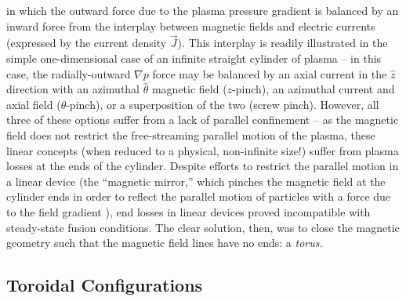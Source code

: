 \noindent in which the outward force due to the plasma pressure gradient is balanced by an inward force from the interplay between magnetic fields and electric currents (expressed by the current density $\vec{J}$).  This interplay is readily illustrated in the simple one-dimensional case of an infinite straight cylinder of plasma -- in this case, the radially-outward $\nabla p$ force may be balanced by an axial current in the $\hat{z}$ direction with an azimuthal $\hat{\theta}$ magnetic field ($z$-pinch), an azimuthal current and axial field ($\theta$-pinch), or a superposition of the two (screw pinch).  However, all three of these options suffer from a lack of parallel confinement -- as the magnetic field does not restrict the free-streaming parallel motion of the plasma, these linear concepts (when reduced to a physical, non-infinite size!) suffer from plasma losses at the ends of the cylinder.  Despite efforts to restrict the parallel motion in a linear device (\eg the ``magnetic mirror,'' which pinches 
the 
magnetic field at the cylinder ends in order to reflect the parallel motion of particles with a force due to the field gradient \cite{Kesner1982}), end losses in linear devices proved incompatible with steady-state fusion conditions.  The clear solution, then, was to close the magnetic geometry such that the magnetic field lines have no ends: a \emph{torus.}

\subsection{Toroidal Configurations}\label{subsec:intro_toroidal}

